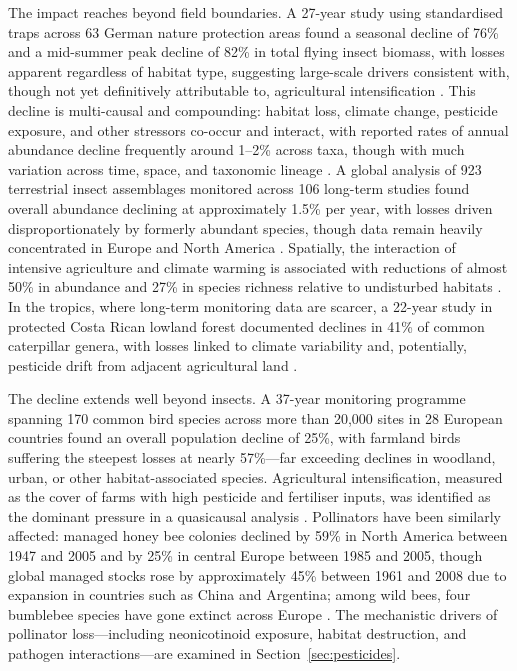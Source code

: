The impact reaches beyond field boundaries. A 27-year study using standardised traps across 63 German nature protection areas found a seasonal decline of 76\% and a mid-summer peak decline of 82\% in total flying insect biomass, with losses apparent regardless of habitat type, suggesting large-scale drivers consistent with, though not yet definitively attributable to, agricultural intensification \cite[pp.~14--15]{hallmann2017insect}. This decline is multi-causal and compounding: habitat loss, climate change, pesticide exposure, and other stressors co-occur and interact, with reported rates of annual abundance decline frequently around 1--2\% across taxa, though with much variation across time, space, and taxonomic lineage \cite[p.~2]{wagner2021insect}. A global analysis of 923 terrestrial insect assemblages monitored across 106 long-term studies found overall abundance declining at approximately 1.5\% per year, with losses driven disproportionately by formerly abundant species, though data remain heavily concentrated in Europe and North America \cite[Fig.~2]{vanklink2024abundant}. Spatially, the interaction of intensive agriculture and climate warming is associated with reductions of almost 50\% in abundance and 27\% in species richness relative to undisturbed habitats \cite[Fig.~2]{outhwaite2022agriculture}. In the tropics, where long-term monitoring data are scarcer, a 22-year study in protected Costa Rican lowland forest documented declines in 41\% of common caterpillar genera, with losses linked to climate variability and, potentially, pesticide drift from adjacent agricultural land \cite[pp.~3,~6]{salcido2020caterpillar}.

The decline extends well beyond insects. A 37-year monitoring programme spanning 170 common bird species across more than 20,000 sites in 28 European countries found an overall population decline of 25\%, with farmland birds suffering the steepest losses at nearly 57\%---far exceeding declines in woodland, urban, or other habitat-associated species. Agricultural intensification, measured as the cover of farms with high pesticide and fertiliser inputs, was identified as the dominant pressure in a quasicausal analysis \cite[Fig.~2]{rigal2023farmlandbirds}. Pollinators have been similarly affected: managed honey bee colonies declined by 59\% in North America between 1947 and 2005 and by 25\% in central Europe between 1985 and 2005, though global managed stocks rose by approximately 45\% between 1961 and 2008 due to expansion in countries such as China and Argentina; among wild bees, four bumblebee species have gone extinct across Europe \cite[p.~1255957-1]{goulson2015bees}. The mechanistic drivers of pollinator loss---including neonicotinoid exposure, habitat destruction, and pathogen interactions---are examined in Section~\ref{sec:pesticides}.

